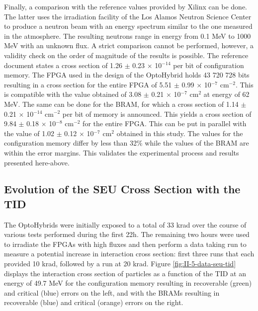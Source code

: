       Finally, a comparison with the reference values provided by Xilinx \cite{XILINX-RELAIBILITY} can be done. The latter uses the irradiation facility of the Los Alamos Neutron Science Center to produce a neutron beam with an energy spectrum similar to the one measured in the atmosphere. The resulting neutrons range in energy from 0.1 MeV to 1000 MeV with an unknown flux. A strict comparison cannot be performed, however, a validity check on the order of magnitude of the results is possible. The reference document states a cross section of 1.26 $\pm$ 0.23 $\times$ 10$^{-14}$ per bit of configuration memory. The FPGA used in the design of the OptoHybrid holds 43 720 728 bits resulting in a cross section for the entire FPGA of 5.51 $\pm$ 0.99 $\times$ 10$^{-7}$ cm$^{-2}$. This is compatible with the value obtained of 3.08 $\pm$ 0.21 $ \times $ 10$^{-7}$ cm$^{2}$ at energy of 62 MeV. The same can be done for the BRAM, for which a cross section of 1.14 $\pm$ 0.21 $ \times $ 10$^{-14}$ cm$^{-2}$ per bit of memory is announced. This yields a cross section of 9.84 $\pm$ 0.18 $\times$ 10$^{-8}$ cm$^{-2}$ for the entire FPGA. This can be put in parallel with the value of 1.02 $\pm$ 0.12 $ \times $ 10$^{-7}$ cm$^2$ obtained in this study. The values for the configuration memory differ by less than 32\% while the values of the BRAM are within the error margins. This validates the experimental process and results presented here-above.

    \subsection{Evolution of the SEU Cross Section with the TID}

      The OptoHybrids were initially exposed to a total of 33 krad over the course of various tests performed during the first 22h. The remaining two hours were used to irradiate the FPGAs with high fluxes and then perform a data taking run to measure a potential increase in interaction cross section: first three runs that each provided 10 krad, followed by a run at 20 krad. Figure \ref{fig:II-5-data-seu-tid} displays the interaction cross section of particles as a function of the TID at an energy of 49.7 MeV for the configuration memory resulting in recoverable (green) and critical (blue) errors on the left, and with the BRAMs resulting in recoverable (blue) and critical (orange) errors on the right. \\

